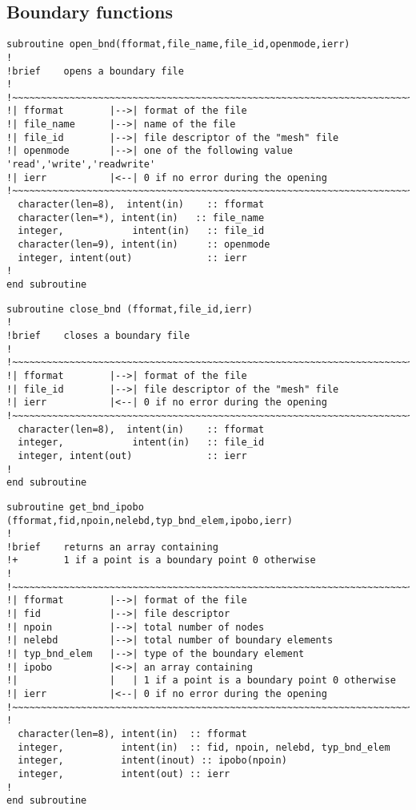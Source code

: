 \subsection{Boundary functions}
%
\begin{lstlisting}
subroutine open_bnd(fformat,file_name,file_id,openmode,ierr)
!
!brief    opens a boundary file
!
!~~~~~~~~~~~~~~~~~~~~~~~~~~~~~~~~~~~~~~~~~~~~~~~~~~~~~~~~~~~~~~~~~~~~~~~
!| fformat        |-->| format of the file
!| file_name      |-->| name of the file
!| file_id        |-->| file descriptor of the "mesh" file
!| openmode       |-->| one of the following value 'read','write','readwrite'
!| ierr           |<--| 0 if no error during the opening
!~~~~~~~~~~~~~~~~~~~~~~~~~~~~~~~~~~~~~~~~~~~~~~~~~~~~~~~~~~~~~~~~~~~~~~~
  character(len=8),  intent(in)    :: fformat
  character(len=*), intent(in)   :: file_name
  integer,            intent(in)   :: file_id
  character(len=9), intent(in)     :: openmode
  integer, intent(out)             :: ierr
!
end subroutine
\end{lstlisting}
%
\begin{lstlisting}
subroutine close_bnd (fformat,file_id,ierr)
!
!brief    closes a boundary file
!
!~~~~~~~~~~~~~~~~~~~~~~~~~~~~~~~~~~~~~~~~~~~~~~~~~~~~~~~~~~~~~~~~~~~~~~~
!| fformat        |-->| format of the file
!| file_id        |-->| file descriptor of the "mesh" file
!| ierr           |<--| 0 if no error during the opening
!~~~~~~~~~~~~~~~~~~~~~~~~~~~~~~~~~~~~~~~~~~~~~~~~~~~~~~~~~~~~~~~~~~~~~~~
  character(len=8),  intent(in)    :: fformat
  integer,            intent(in)   :: file_id
  integer, intent(out)             :: ierr
!
end subroutine
\end{lstlisting}
%
\begin{lstlisting}
subroutine get_bnd_ipobo (fformat,fid,npoin,nelebd,typ_bnd_elem,ipobo,ierr)
!
!brief    returns an array containing 
!+        1 if a point is a boundary point 0 otherwise
!
!~~~~~~~~~~~~~~~~~~~~~~~~~~~~~~~~~~~~~~~~~~~~~~~~~~~~~~~~~~~~~~~~~~~~~~~
!| fformat        |-->| format of the file
!| fid            |-->| file descriptor
!| npoin          |-->| total number of nodes
!| nelebd         |-->| total number of boundary elements
!| typ_bnd_elem   |-->| type of the boundary element
!| ipobo          |<->| an array containing
!|                |   | 1 if a point is a boundary point 0 otherwise
!| ierr           |<--| 0 if no error during the opening
!~~~~~~~~~~~~~~~~~~~~~~~~~~~~~~~~~~~~~~~~~~~~~~~~~~~~~~~~~~~~~~~~~~~~~~~
!
  character(len=8), intent(in)  :: fformat
  integer,          intent(in)  :: fid, npoin, nelebd, typ_bnd_elem
  integer,          intent(inout) :: ipobo(npoin)
  integer,          intent(out) :: ierr
!
end subroutine
\end{lstlisting}
